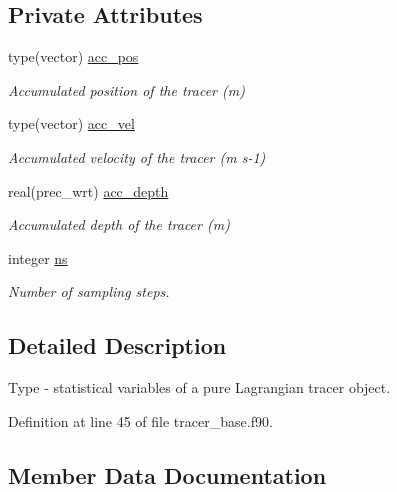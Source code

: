\subsection*{Private Attributes}
\begin{DoxyCompactItemize}
\item 
type(vector) \mbox{\hyperlink{structtracer__base__mod_1_1tracer__stats__class_aa60964087b2515e7ae6824f38470594e}{acc\+\_\+pos}}
\begin{DoxyCompactList}\small\item\em Accumulated position of the tracer (m) \end{DoxyCompactList}\item 
type(vector) \mbox{\hyperlink{structtracer__base__mod_1_1tracer__stats__class_adab48ad9efa9431a5101e6f22c6b16d1}{acc\+\_\+vel}}
\begin{DoxyCompactList}\small\item\em Accumulated velocity of the tracer (m s-\/1) \end{DoxyCompactList}\item 
real(prec\+\_\+wrt) \mbox{\hyperlink{structtracer__base__mod_1_1tracer__stats__class_ace9d4e6796a669eba7001671ab0b38b8}{acc\+\_\+depth}}
\begin{DoxyCompactList}\small\item\em Accumulated depth of the tracer (m) \end{DoxyCompactList}\item 
integer \mbox{\hyperlink{structtracer__base__mod_1_1tracer__stats__class_a5e01cdc2592ecf31711151cf54e3b4d5}{ns}}
\begin{DoxyCompactList}\small\item\em Number of sampling steps. \end{DoxyCompactList}\end{DoxyCompactItemize}


\subsection{Detailed Description}
Type -\/ statistical variables of a pure Lagrangian tracer object. 

Definition at line 45 of file tracer\+\_\+base.\+f90.



\subsection{Member Data Documentation}
\mbox{\label{structtracer__base__mod_1_1tracer__stats__class_ace9d4e6796a669eba7001671ab0b38b8}} 
